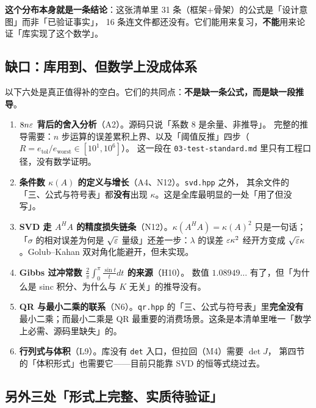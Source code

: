 \textbf{这个分布本身就是一条结论}：这张清单里 31 条（框架+骨架）的公式是「设计意图」而非「已验证事实」，
16 条连文件都还没有。它们能用来复习，\textbf{不能}用来论证「库实现了这个数学」。

\subsection{缺口：库用到、但数学上没成体系}

以下六处是真正值得补的空白。它们的共同点：\textbf{不是缺一条公式，而是缺一段推导}。

\begin{enumerate}[leftmargin=1.6em]
  \item \textbf{$8n\varepsilon$ 背后的舍入分析}（A2）。源码只说「系数 8 是余量、非推导」。
        完整的推导需要：$n$ 步运算的误差累积上界、以及「阈值反推」四步（$R=e_{\text{tol}}/e_{\text{worst}}\in[10^{1},10^{6}]$）。
        这一段在 \texttt{03-test-standard.md} 里只有工程口径，没有数学证明。

  \item \textbf{条件数 $\kappa(A)$ 的定义与增长}（A4、N12）。\texttt{svd.hpp} 之外，
        其余文件的「三、公式与符号表」都\textbf{没有}出现 $\kappa$。这是全库最明显的一处「用了但没写」。

  \item \textbf{SVD 走 $A^{H}A$ 的精度损失链条}（N12）。$\kappa(A^{H}A)=\kappa(A)^{2}$ 只是一句话；
        「$\sigma$ 的相对误差为何是 $\sqrt{\varepsilon}$ 量级」还差一步：$\lambda$ 的误差 $\varepsilon\kappa^{2}$ 经开方变成
        $\sqrt{\varepsilon}\kappa$。Golub--Kahan 双对角化能避开，但未实现。

  \item \textbf{Gibbs 过冲常数 $\frac2\pi\int_0^\pi\frac{\sin t}{t}dt$ 的来源}（H10）。
        数值 $1.08949\ldots$ 有了，但「为什么是 sinc 积分、为什么与 $K$ 无关」的推导没有。

  \item \textbf{QR 与最小二乘的联系}（N6）。\texttt{qr.hpp} 的「三、公式与符号表」里\textbf{完全没有}
        最小二乘；而最小二乘是 QR 最重要的消费场景。这条是本清单里唯一「数学上必需、源码里缺失」的。

  \item \textbf{行列式与体积}（L9）。库没有 \texttt{det} 入口，但拉回（M4）需要 $\det J$，
        第四节的「体积形式」也需要它——目前只能靠 SVD 的恒等式绕过去。
\end{enumerate}

\subsection{另外三处「形式上完整、实质待验证」}

